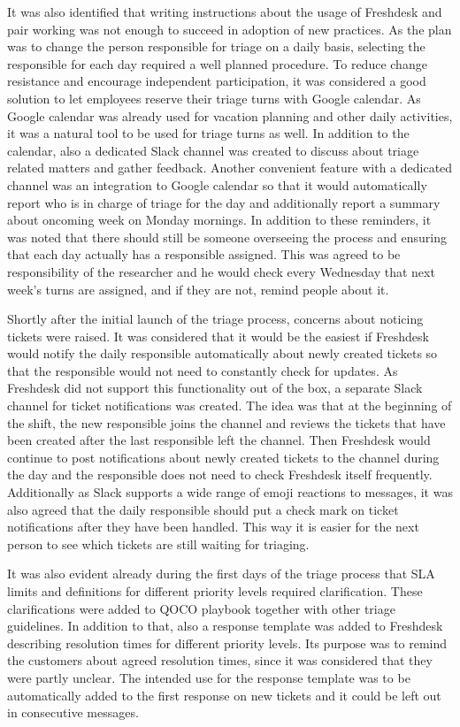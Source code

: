 It was also identified that writing instructions about the usage of Freshdesk and pair working was not enough to succeed in adoption of new practices. As the plan was to change
the person responsible for triage on a daily basis, selecting the responsible for each day required a well planned procedure. To reduce change resistance and encourage
independent participation, it was considered a good solution to let employees reserve their triage turns with Google calendar. As Google calendar was already used for
vacation planning and other daily activities, it was a natural tool to be used for triage turns as well. In addition to the calendar, also a dedicated Slack channel was created
to discuss about triage related matters and gather feedback. Another convenient feature with a dedicated channel was an integration to Google calendar so that it would
automatically report who is in charge of triage for the day and additionally report a summary about oncoming week on Monday mornings. In addition to these reminders, it was
noted that there should still be someone overseeing the process and ensuring that each day actually has a responsible assigned. This was agreed to be responsibility of 
the researcher and he would check every Wednesday that next week's turns are assigned, and if they are not, remind people about it.

Shortly after the initial launch of the triage process, concerns about noticing tickets were raised. It was considered that it would be the easiest if Freshdesk would notify
the daily responsible automatically about newly created tickets so that the responsible would not need to constantly check for updates. As Freshdesk did not support this
functionality out of the box, a separate Slack channel for ticket notifications was created. The idea was that at the beginning of the shift, the new responsible joins the
channel and reviews the tickets that have been created after the last responsible left the channel. Then Freshdesk would continue to post notifications about newly created
tickets to the channel during the day and the responsible does not need to check Freshdesk itself frequently. Additionally as Slack supports a wide range of emoji reactions
to messages, it was also agreed that the daily responsible should put a check mark on ticket notifications after they have been handled. This way it is easier for the next
person to see which tickets are still waiting for triaging.

It was also evident already during the first days of the triage process that SLA limits and definitions for different priority levels required clarification. These clarifications
were added to QOCO playbook together with other triage guidelines. In addition to that, also a response template was added to Freshdesk describing resolution times for different
priority levels. Its purpose was to remind the customers about agreed resolution times, since it was considered that they were partly unclear. The intended use for the response template
was to be automatically added to the first response on new tickets and it could be left out in consecutive messages.

